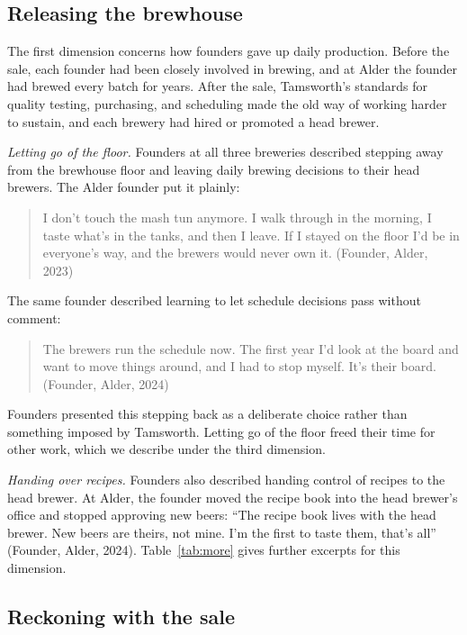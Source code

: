 \documentclass[12pt]{article}
\begin{document}
\subsection{Releasing the brewhouse}

The first dimension concerns how founders gave up daily production. Before the sale, each founder had been closely involved in brewing, and at Alder the founder had brewed every batch for years. After the sale, Tamsworth's standards for quality testing, purchasing, and scheduling made the old way of working harder to sustain, and each brewery had hired or promoted a head brewer.

\textit{Letting go of the floor.} Founders at all three breweries described stepping away from the brewhouse floor and leaving daily brewing decisions to their head brewers. The Alder founder put it plainly:

\begin{quote}
I don't touch the mash tun anymore. I walk through in the morning, I taste what's in the tanks, and then I leave. If I stayed on the floor I'd be in everyone's way, and the brewers would never own it. (Founder, Alder, 2023)
\end{quote}

\noindent The same founder described learning to let schedule decisions pass without comment:

\begin{quote}
The brewers run the schedule now. The first year I'd look at the board and want to move things around, and I had to stop myself. It's their board. (Founder, Alder, 2024)
\end{quote}

\noindent Founders presented this stepping back as a deliberate choice rather than something imposed by Tamsworth. Letting go of the floor freed their time for other work, which we describe under the third dimension.

\textit{Handing over recipes.} Founders also described handing control of recipes to the head brewer. At Alder, the founder moved the recipe book into the head brewer's office and stopped approving new beers: ``The recipe book lives with the head brewer. New beers are theirs, not mine. I'm the first to taste them, that's all'' (Founder, Alder, 2024). Table~\ref{tab:more} gives further excerpts for this dimension.

\subsection{Reckoning with the sale}
\end{document}
